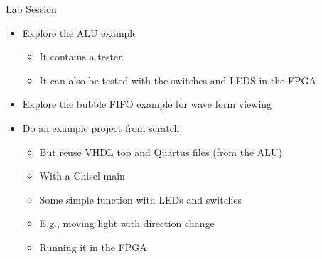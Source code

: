 \documentclass[xcolor=pdflatex,dvipsnames,table]{beamer}
\begin{document}
\begin{frame}[fragile]{Lab Session}
\begin{itemize}
\item Explore the ALU example
\begin{itemize}
\item It contains a tester
\item It can also be tested with the switches and LEDS in the FPGA
\end{itemize}
\item Explore the bubble FIFO example for wave form viewing
\item Do an example project from scratch
\begin{itemize}
\item But reuse VHDL top and Quartus files (from the ALU)
\item With a Chisel main
\item Some simple function with LEDs and switches 
\item E.g., moving light with direction change
\item Running it in the FPGA
\end{itemize}
\end{itemize}
\end{frame}
\end{document}
